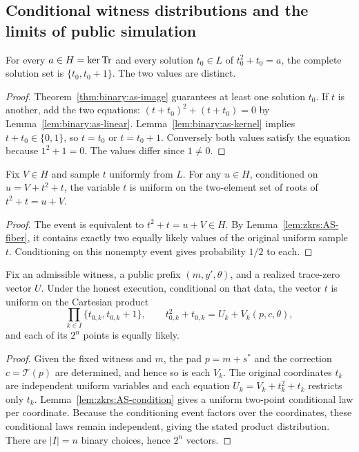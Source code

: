 \subsection{Conditional witness distributions and the limits of public simulation}\label{sec:zkrs:conditional}

\begin{lemma}\label{lem:zkrs:AS-fiber}
For every $a\in H=\ker\operatorname{Tr}$ and every solution
$t_0\in L$ of $t_0^2+t_0=a$, the complete
solution set is $\{t_0,t_0+1\}$.
The two values are distinct.
\end{lemma}
\begin{proof}
Theorem~\ref{thm:binary:as-image}
guarantees at least one solution $t_0$.
If $t$ is another, add the two equations:
$(t+t_0)^2+(t+t_0)=0$ by
Lemma~\ref{lem:binary:as-linear}.
Lemma~\ref{lem:binary:as-kernel}
implies $t+t_0\in\{0,1\}$,
so $t=t_0$ or $t=t_0+1$.
Conversely both values satisfy the equation
because $1^2+1=0$.
The values differ since $1\ne0$.
\end{proof}

\begin{lemma}\label{lem:zkrs:AS-condition}
Fix $V\in H$ and sample $t$ uniformly from $L$.
For any $u\in H$, conditioned on
$u=V+t^2+t$, the variable $t$ is uniform
on the two-element set of roots of
$t^2+t=u+V$.
\end{lemma}
\begin{proof}
The event is equivalent to
$t^2+t=u+V\in H$.
By Lemma~\ref{lem:zkrs:AS-fiber}, it contains
exactly two equally likely values of the original
uniform sample $t$. Conditioning on this
nonempty event gives probability $1/2$ to each.
\end{proof}

\begin{lemma}\label{lem:zkrs:vector-fiber}
Fix an admissible witness, a public prefix $(m,y',\theta)$,
and a realized trace-zero vector $U$.
Under the honest execution, conditional on that data,
the vector $t$ is uniform on the Cartesian product
\[
 \prod_{k\in I}\{t_{0,k},t_{0,k}+1\},
 \qquad
 t_{0,k}^2+t_{0,k}=U_k+V_k(p,c,\theta),
\]
and each of its $2^n$ points is equally likely.
\end{lemma}
\begin{proof}
Given the fixed witness and $m$, the pad
$p=m+s^*$ and the correction $c=\mathcal T(p)$
are determined, and hence so is each $V_k$.
The original coordinates $t_k$ are independent
uniform variables and each equation
$U_k=V_k+t_k^2+t_k$ restricts only $t_k$.
Lemma~\ref{lem:zkrs:AS-condition} gives a
uniform two-point conditional law per coordinate.
Because the conditioning event factors over
the coordinates, these conditional laws remain
independent, giving the stated product distribution.
There are $|I|=n$ binary choices, hence $2^n$ vectors.
\end{proof}

